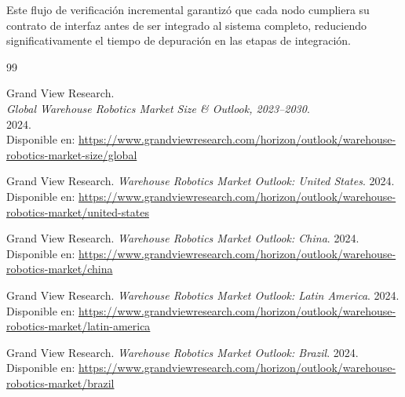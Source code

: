 \documentclass{article}
\begin{document}
\begin{appendices}
\begin{itemize}
\end{itemize}

Este flujo de verificación incremental garantizó que cada nodo cumpliera su contrato de interfaz antes de ser integrado al sistema completo, reduciendo significativamente el tiempo de depuración en las etapas de integración.


\newpage
\begin{thebibliography}{99}

    Grand View Research.\\
    \textit{Global Warehouse Robotics Market Size \& Outlook, 2023--2030}.\\
    2024.\\
    Disponible en: \url{https://www.grandviewresearch.com/horizon/outlook/warehouse-robotics-market-size/global}
    
    Grand View Research.  
    \textit{Warehouse Robotics Market Outlook: United States}.  
    2024.  
    Disponible en: \url{https://www.grandviewresearch.com/horizon/outlook/warehouse-robotics-market/united-states}


    Grand View Research.  
    \textit{Warehouse Robotics Market Outlook: China}.  
    2024.  
    Disponible en: \url{https://www.grandviewresearch.com/horizon/outlook/warehouse-robotics-market/china}


    Grand View Research.  
    \textit{Warehouse Robotics Market Outlook: Latin America}.  
    2024.  
    Disponible en: \url{https://www.grandviewresearch.com/horizon/outlook/warehouse-robotics-market/latin-america}


    
    Grand View Research.  
    \textit{Warehouse Robotics Market Outlook: Brazil}.  
    2024.  
    Disponible en: \url{https://www.grandviewresearch.com/horizon/outlook/warehouse-robotics-market/brazil}


\end{thebibliography}

\end{appendices}
\end{document}
